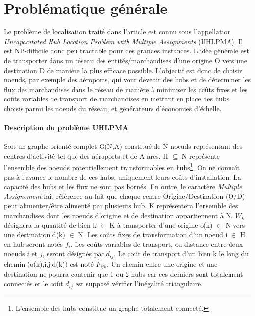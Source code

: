 \section{Problématique générale}

Le problème de localisation traité dans l'article est connu sous l'appellation \textit{Uncapacitated Hub Location Problem with Multiple Assignments} (UHLPMA). Il est NP-difficile donc peu tractable pour des grandes instances. L'idée générale est de transporter dans un réseau des entités/marchandises d'une origine O vers une destination D de manière la plus efficace possible. L'objectif est donc de choisir noeuds, par exemple des aéroports, qui vont devenir des hubs et de déterminer les flux des marchandises dans le réseau de manière à minimiser les coûts fixes et les coûts variables de transport de marchandises en mettant en place des hubs, choisis parmi les noeuds du réseau, et générateurs d'économies d'échelle. 

\paragraph{Description du problème UHLPMA}
Soit un graphe orienté complet G(N,A) constitué de N noeuds représentant des centres d'activité tel que des aéroports et de A arcs. H $\subseteq $ N représente l'ensemble des noeuds potentiellement transformables en hubs\footnote{L'ensemble des hubs constitue un graphe totalement connecté.}. On ne connaît pas à l'avance le nombre de ces hubs, uniquement leurs coûts d'installation. La capacité des hubs et les flux ne sont pas bornés. En outre, le caractère \textit{Multiple Assignement} fait référence au fait que chaque centre Origine/Destination (O/D) peut alimenter/être alimenté par plusieurs hub.
K représentera l'ensemble des marchandises dont les noeuds d'origine et de destination
appartiennent à N. $ W_k $ désignera la quantité de bien k $\in$ K  à transporter d'une origine o(k) $\in$ N vers une destination d(k) $\in$ N. Les coûts fixes de transformation d'un noeud i $\in$ H en hub seront notés $ f_i$. Les coûts variables de transport, ou distance entre deux noeuds $i$ et $j$, seront désignés par $d_{ij}$. Le coût de transport d'un bien k le long du chemin (o(k),i,j,d(k)) est noté $ \hat{F}_{ijk}$. Un chemin entre une origine et une destination ne pourra contenir que 1 ou 2 hubs car ces derniers sont totalement connectés et le coût $d_{ij}$ est supposé vérifier l'inégalité triangulaire. 




